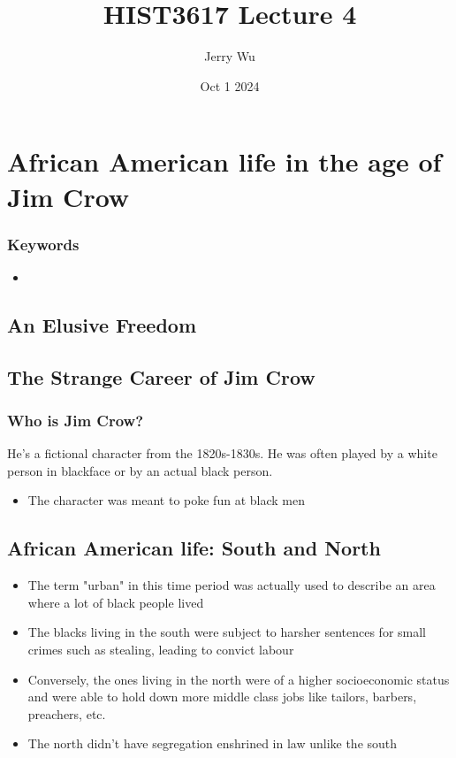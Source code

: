 \documentclass[12pt]{book}
\title{HIST3617 Lecture 4}
\author{Jerry Wu}
\date{Oct 1 2024}
\begin{document}
\maketitle

\tableofcontents

\chapter{African American life in the age of Jim Crow}

\subsection{Keywords}

\begin{itemize}
    \item 
\end{itemize}

\section{An Elusive Freedom}




\section{The Strange Career of Jim Crow}

\subsection{Who is Jim Crow?}

He's a fictional character from the 1820s-1830s. He was often played by a white person in blackface or by an actual black person.

\begin{itemize}
    \item The character was meant to poke fun at black men
\end{itemize}



\section{African American life: South and North}

\begin{itemize}
    \item The term "urban" in this time period was actually used to describe an area where a lot of black people lived
    \item The blacks living in the south were subject to harsher sentences for small crimes such as stealing, leading to convict labour
    \item Conversely, the ones living in the north were of a higher socioeconomic status and were able to hold down more middle class jobs like tailors, barbers, preachers, etc.
    \item The north didn't have segregation enshrined in law unlike the south
    
\end{itemize}
\end{document}
